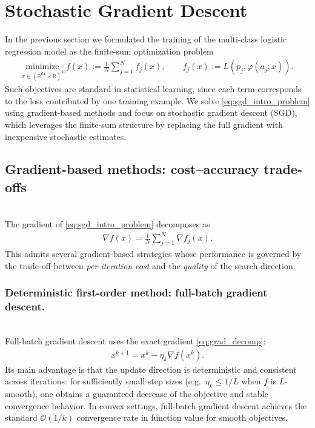 \section{Stochastic Gradient Descent}
In the previous section we formulated the training of the multi-class logistic regression model as the finite-sum optimization problem
\begin{align}
\label{eq:sgd_intro_problem}
\underset{x\in(\mathbb{R}^{64}\times \mathbb{R})^{10}}{\text{minimize }} 
f(x)
:=
\frac{1}{N}\sum_{j=1}^N f_j(x),
\qquad
f_j(x):=L(p_j,\varphi(a_j;x)).
\end{align}
Such objectives are standard in statistical learning, since each term corresponds to the loss contributed by one training example.
We solve \cref{eq:sgd_intro_problem} using gradient-based methods and focus on stochastic gradient descent (SGD), which leverages the finite-sum structure by replacing the full gradient with inexpensive stochastic estimates.\cite{Bottou2012}

\subsection{Gradient-based methods: cost--accuracy trade-offs}\;\\
The gradient of \cref{eq:sgd_intro_problem} decomposes as
\begin{align}
\label{eq:grad_decomp}
\nabla f(x)=\frac{1}{N}\sum_{j=1}^N \nabla f_j(x).
\end{align}
This admits several gradient-based strategies whose performance is governed by the trade-off between \emph{per-iteration cost} and the \emph{quality} of the search direction.

\subsubsection{Deterministic first-order method: full-batch gradient descent.}\;\\
Full-batch gradient descent uses the exact gradient \cref{eq:grad_decomp}:
\begin{align}
\label{eq:gd}
x^{k+1}=x^k-\eta_k \nabla f(x^k).
\end{align}
Its main advantage is that the update direction is deterministic and consistent across iterations: for sufficiently small step sizes (e.g.\ $\eta_k\le 1/L$ when $f$ is $L$-smooth), one obtains a guaranteed decrease of the objective and stable convergence behavior.\cite{Boyd2009,Bubeck2015}
In convex settings, full-batch gradient descent achieves the standard $\mathcal{O}(1/k)$ convergence rate in function value for smooth objectives.\cite{Bubeck2015}

